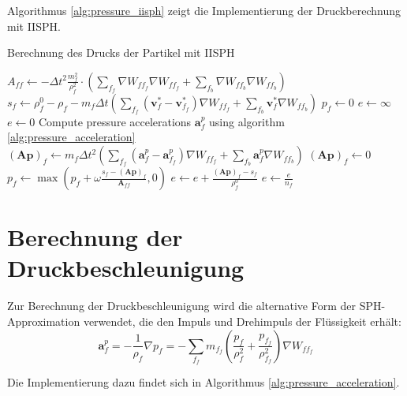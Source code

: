 \documentclass{scrreprt}
\begin{document}
Algorithmus \ref{alg:pressure_iisph} zeigt die Implementierung der Druckberechnung mit IISPH.

\begin{algorithm}
    \caption{Berechnung des Drucks der Partikel mit IISPH}
    \label{alg:pressure_iisph}
    \begin{algorithmic}[1]
            \State $A_{ff} \gets -\Delta t^2 \frac{m_f^2}{\rho_f^2} \cdot \left(\sum_{f_f}\nabla W_{ff_f} \nabla W_{ff_f} + \sum_{f_b}\nabla W_{ff_b} \nabla W_{ff_b}\right)$
            \State $s_f \gets \rho_f^0 - \rho_f - m_f \Delta t \left(\sum_{f_f}(\textbf{v}_f^* - \textbf{v}_{f_f}^*) \nabla W_{ff_f} + \sum_{f_b}\textbf{v}_f^* \nabla W_{ff_b}\right)$
            \State $p_f \gets 0$
        \EndFor
         \State $e \gets \infty$
            \State $e \gets 0$
            \State Compute pressure accelerations $\textbf{a}_f^p$ using algorithm \ref{alg:pressure_acceleration}
                \State $(\textbf{A}\textbf{p})_f \gets m_f \Delta t^2\left(\sum_{f_f}(\textbf{a}_f^p - \textbf{a}_{f_f}^p) \nabla W_{ff_f} + \sum_{f_b}\textbf{a}_f^p \nabla W_{ff_b}\right)$
                    \State $(\textbf{A}\textbf{p})_f \gets 0$
                \EndIf
                \State $p_f \gets \max(p_f + \omega \frac{s_f - (\textbf{A}\textbf{p})_f}{\textbf{A}_{ff}}, 0)$
                \State $e \gets e + \frac{(\textbf{A}\textbf{p})_f - s_f}{\rho_f^0}$
            \EndFor
            \State $e \gets \frac{e}{n_{f}}$
        \EndWhile
    \end{algorithmic}
    \end{algorithm}


\section{Berechnung der Druckbeschleunigung}
Zur Berechnung der Druckbeschleunigung wird die alternative Form der SPH-Approximation verwendet, die den Impuls und Drehimpuls der Flüssigkeit erhält:
\begin{equation}
    \textbf{a}_f^p = -\frac{1}{\rho_f} \nabla p_f = -\sum_{f_f} m_{f_f} \left( \frac{p_f}{\rho_f^2} + \frac{p_{f_f}}{\rho_{f_f}^2} \right) \nabla W_{ff_f}
\end{equation}

Die Implementierung dazu findet sich in Algorithmus \ref{alg:pressure_acceleration}.
\end{document}

